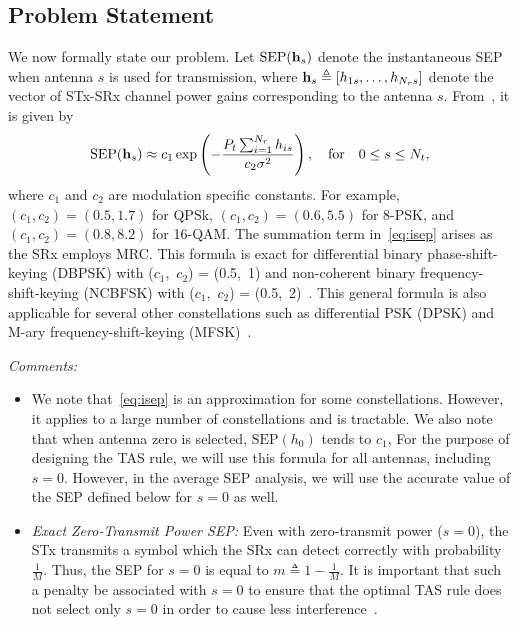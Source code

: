\documentclass[12pt,draftcls,peerreview,onecolumn]{IEEEtran}
\newcommand{\define}{\triangleq}
\newcommand{\SEP}{\text{SEP}}
\newcommand{\nx}{{0}}
\newcommand{\Nt}{{N_t}}
\newcommand{\Nr}{{N_r}}
\newcommand{\Pt}{{P_t}}
\newcommand{\such}{h}
\newcommand{\hk}[1]{{\such_{#1}}}
\newcommand{\noisevar}{\sigma^2}
\newcommand{\cone}{c_{1}}
\newcommand{\ctwo}{c_{2}}
\newcommand{\zerosep}{m}
\begin{document}
\subsection{Problem Statement}
We now formally state our problem. Let $\SEP(\hs)$ denote the instantaneous SEP when antenna $s$ is used for transmission, where $\hs\define\left[\hk{1s},\ldots,\hk{\Nr s} \right]$  denote the vector of STx-SRx channel power gains corresponding to the antenna $s$. From~\cite[(14)]{Chung_2001_TCom}, it is given by  
\begin{equation}
\SEP(\hs) \approx \cone \exp\left({-\frac{\Pt\sum_{i=1}^{\Nr}\hk{is}}{\ctwo\noisevar} }\right), \quad\text{for} \quad 0\leq s \leq \Nt,
\label{eq:isep}
\end{equation} 
where $\cone$ and $\ctwo$ are modulation specific constants. For example, $(\cone,\ctwo )=(0.5,1.7)$ for QPSk,  $(\cone,\ctwo)=(0.6,5.5)$ for 8-PSK, and  $(\cone,\ctwo )=(0.8,8.2)$ for 16-QAM. The summation term in~\eqref{eq:isep} arises as the SRx employs MRC. This formula is exact for differential binary phase-shift-keying (DBPSK) with ($\cone$,~$\ctwo$) = (0.5,~1)  and non-coherent binary frequency-shift-keying (NCBFSK) with  ($\cone$,~$\ctwo$) = (0.5,~2)~\cite{Fakhan_2014_TSP}. This general formula is also applicable for several other constellations such as differential PSK (DPSK) and M-ary frequency-shift-keying (MFSK)~\cite{simon_alouini_book}. 


{\em Comments:}
\begin{itemize}
\item We note that~\eqref{eq:isep} is an approximation for some constellations. However, it applies to a large number of constellations and is tractable. We also note that when antenna zero is selected, $\SEP(\hk{\nx})$ tends to  $\cone$,  For the purpose of designing the TAS rule, we will use this formula for all antennas, including $s=\nx$. However, in the average SEP analysis, we will use the accurate value of the SEP defined below for $s=\nx$ as well.
\item {\em Exact Zero-Transmit Power SEP:} Even with zero-transmit power ($s=\nx$), the STx transmits a symbol which the SRx can detect correctly with probability $\frac{1}{M}$. Thus, the SEP for $s=\nx$ is equal to $\zerosep \define 1 - \frac{1}{M}$. It is important that such a penalty be associated with $s=\nx$ to ensure that the optimal TAS rule does not select only $s=\nx$ in order to cause less interference~\cite{Kashyap_2014_TCOM,Sarvendranath_2013_TCOM}. 	
\end{itemize}
\end{document}
